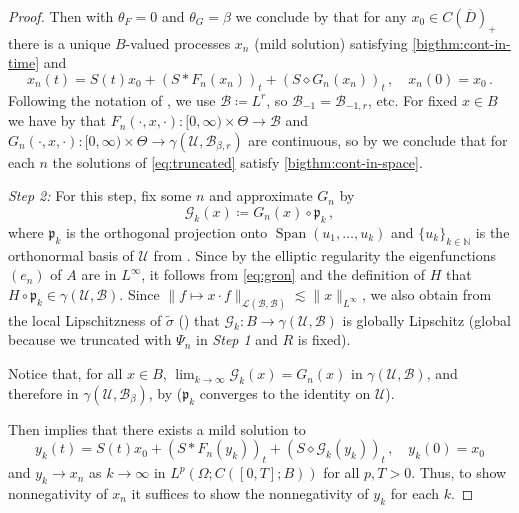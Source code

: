 \documentclass[final]{amsart}
\numberwithin{thm}{section}
\numberwithin{equation}{section}
\newcommand{\U}{\mathcal{U}}
\newcommand{\N}{\mathbb{N}}
\newcommand{\Ll}{\mathcal{L}}
\newcommand{\B}{\mathcal{B}}
\newcommand{\cdom}{C(\overline D)_+}
\begin{document}
\begin{proof}
    
    
    
    
    Then with $\theta_F = 0$ and $\theta_G = \beta$ we conclude by  that for any $x_0 \in \cdom$ there is a unique $B$-valued processes $x_n$ (mild solution) satisfying \ref{bigthm:cont-in-time} and
    \begin{equation}\label{eq:truncated}
            x_n(t) = S(t) x_0 + (S * F_n(x_n))_t + (S \diamond G_n(x_n))_t\,, \quad x_n(0) = x_0 \,.
    \end{equation}
    Following the notation of , we  use $\B \coloneqq L^r$, so $\B_{-1} = \B_{-1,r}$, etc. For fixed $x \in B$ we have by  that $F_n(\cdot,x,\cdot): [0,\infty) \times \Theta \to \B$ and $G_n(\cdot,x,\cdot): [0,\infty) \times \Theta \to \gamma(\U,\B_{\beta,r})$ are continuous, so by  we conclude that for each $n$ the solutions of \eqref{eq:truncated} satisfy \ref{bigthm:cont-in-space}.

    \textit{Step 2:} For this step, fix some $n$ and approximate $G_n$ by
    $$
    \mathcal{G}_k(x) \coloneqq G_n(x)\circ \mathfrak{p}_k \,,
    $$
    where $\mathfrak{p}_k$ is the orthogonal projection onto $\operatorname{Span}(u_1,\dots,u_k)$ and $\{u_k\}_{k \in \N}$ is the orthonormal basis of $\U$ from . Since 
    by the elliptic regularity the eigenfunctions $(e_n)$ of $A$ are in $L^\infty$, it follows from \eqref{eq:gron} and the definition of $H$ that $H \circ \mathfrak{p}_k \in \gamma(\U,\B)$. Since $\|f \mapsto x\cdot f\|_{\Ll(\B,\B)} \lesssim \|x\|_{L^\infty}$, we also obtain from the local Lipschitzness of $\tilde \sigma$ () that $\mathcal{G}_k: B \to \gamma(\U,\B)$ is globally Lipschitz (global because we truncated with $\Psi_n$ in \textit{Step 1} and $R$ is fixed). 
    
    Notice that, for all $x \in B$, $\lim_{k \to \infty} \mathcal{G}_k(x) = G_n(x)$ in  $\gamma(\U,\B)$, and therefore in $\gamma(\U,\B_{\beta})$, by \cite[Proposition 2.4]{umd-integration} ($\mathfrak{p}_k$ converges to the identity on $\U$).
    
    
    
    
    
    
    
    
    Then  implies that there exists a mild solution to
    \begin{equation}\label{eq:smoothed-G}
        y_k(t) = S(t) x_0 + (S * F_n(y_k))_t + (S \diamond \mathcal{G}_k(y_k))_t\,, \quad y_k(0) = x_0
    \end{equation}
    and $y_k \to x_n$ as $k \to \infty$ in $L^p(\Omega; C([0,T];B))$ for all $p,T > 0$. Thus, to show nonnegativity of $x_n$ it suffices to show the nonnegativity of $y_k$ for each $k$.


\end{proof}
\end{document}
